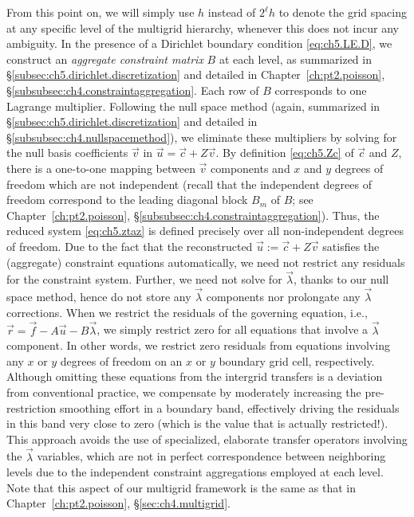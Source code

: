 From this point on, we will simply use $h$ instead of $2^{\ell}h$ to denote the grid spacing at any specific level of the multigrid hierarchy, whenever this does not incur any ambiguity. In the presence of a Dirichlet boundary condition \eqref{eq:ch5.LE.D}, we construct an \emph{aggregate constraint matrix} $B$ at each level, as summarized in \S\ref{subsec:ch5.dirichlet.discretization} and detailed in Chapter~\ref{ch:pt2.poisson}, \S\ref{subsubsec:ch4.constraintaggregation}. Each row of $B$ corresponds to one Lagrange multiplier. Following the null space method (again, summarized in \S\ref{subsec:ch5.dirichlet.discretization} and detailed in \S\ref{subsubsec:ch4.nullspacemethod}), we eliminate these multipliers by solving for the null basis coefficients $\vec{v}$ in $\vec{u} = \vec{c} + Z \vec{v}$. By definition \eqref{eq:ch5.Zc} of $\vec{c}$ and $Z$, there is a one-to-one mapping between $\vec{v}$ components and $x$ and $y$ degrees of freedom which are not independent (recall that the independent degrees of freedom correspond to the leading diagonal block $B_m$ of $B$; see Chapter~\ref{ch:pt2.poisson}, \S\ref{subsubsec:ch4.constraintaggregation}). Thus, the reduced system \eqref{eq:ch5.ztaz} is defined precisely over all non-independent degrees of freedom. Due to the fact that the reconstructed $\vec{u} := \vec{c} + Z \vec{v}$ satisfies the (aggregate) constraint equations automatically, we need not restrict any residuals for the constraint system. Further, we need not solve for $\vec{\lambda}$, thanks to our null space method, hence do not store any $\vec{\lambda}$ components nor prolongate any $\vec{\lambda}$ corrections. When we restrict the residuals of the governing equation, i.e., $\vec{r} = \vec{f} - A \vec{u} - B \vec{\lambda}$, we simply restrict zero for all equations that involve a $\vec{\lambda}$ component. In other words, we restrict zero residuals from equations involving any $x$ or $y$ degrees of freedom on an $x$ or $y$ boundary grid cell, respectively. Although omitting these equations from the intergrid transfers is a deviation from conventional practice, we compensate by moderately increasing the pre-restriction smoothing effort in a boundary band, effectively driving the residuals in this band very close to zero (which is the value that is actually restricted!). This approach avoids the use of specialized, elaborate transfer operators involving the $\vec{\lambda}$ variables, which are not in perfect correspondence between neighboring levels due to the independent constraint aggregations employed at each level. Note that this aspect of our multigrid framework is the same as that in Chapter~\ref{ch:pt2.poisson}, \S\ref{sec:ch4.multigrid}.

